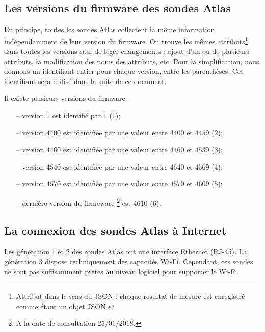 \subsection{Les versions du firmware des sondes Atlas} \label{subsec:firmwareversion}
En principe, toutes les sondes Atlas collectent la même information, indépendamment de leur version du firmware. On trouve les mêmes attributs\footnote{Attribut dans le sens du JSON : chaque résultat de mesure est enregistré comme étant un objet JSON.}  dans toutes les versions sauf de léger changements : ajout d'un ou de plusieurs attributs, la modification des noms des attributs, etc. Pour la simplification, nous donnons un identifiant entier pour chaque version, entre les parenthèses. Cet identifiant sera utilisé dans la suite de ce document. 



Il existe plusieurs versions du firmware:
\begin{itemize}
	\setlength\itemsep{0.1 cm}
	\item[--] version $1$ est identifié par  $1$ (1);
	\item[--] version $4400$  est identifiée par une valeur entre  $4400$ et $4459$ (2);
	\item[--] version $4460$ est identifiée par une valeur entre $4460$ et $4539$ (3);
	\item[--] version $4540$  est identifiée par une valeur entre  $4540$ et $4569$ (4);
	\item[--]  version $4570$  est identifiée par une valeur entre $4570$ et $4609$ (5);
	\item[--] dernière version du firmeware \footnote{A la date de consultation $ 25/01/2018 $.} est $4610$ (6). 
\end{itemize}

\subsection{La connexion des sondes Atlas à Internet}

Les génération $1$ et $2$ des sondes  Atlas ont une interface Ethernet (RJ-45). La génération $3$ dispose techniquement des capacités Wi-Fi. Cependant, ces sondes ne sont pas suffisamment prêtes au niveau logiciel pour supporter le Wi-Fi.

